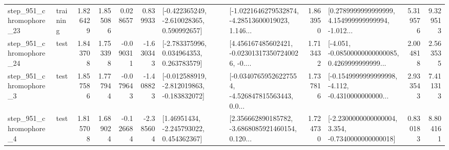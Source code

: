 \begin{tabular}{llrrrrllrlrr}
  step\_951\_chromophore\_23 &  training &      1.826429 &    1.855086 &      0.028657 &  0.839933 &   [-0.422365249, -2.610028365, 0.590992657] &  [-1.0221646279532874, -4.28513600019023, 1.146... &       1.863950 &  [0.2789999999999999, 4.154999999999994, -1.012... &            5.319576 &          9.329513 \\
  step\_951\_chromophore\_24 &      test &      1.843708 &    1.753398 &     -0.090311 & -1.630343 &    [-2.783375996, 0.034964353, 0.263783579] &  [4.456167485602421, -0.023013173507240026, -0.... &       1.713432 &  [-4.051, -0.08500000000000085, 0.4269999999999... &            2.004818 &          2.563535 \\
   step\_951\_chromophore\_3 &      test &      1.857586 &    1.777944 &     -0.079643 & -1.408823 &  [-0.012588919, -2.812019863, -0.183832072] &  [-0.03407659526227554, -4.526847815563443, 0.0... &       1.737816 &  [-0.1549999999999998, -4.112, -0.4310000000000... &            2.933543 &          7.411313 \\
   step\_951\_chromophore\_4 &      test &      1.815708 &    1.689024 &     -0.126684 & -2.385604 &     [1.46951434, -2.245793022, 0.454362367] &  [2.356662890185782, -3.6868085921460154, 0.120... &       1.724730 &  [-2.2300000000000004, 3.354, -0.7340000000000018] &            0.830183 &          8.804161 \\
\bottomrule
\end{tabular}

